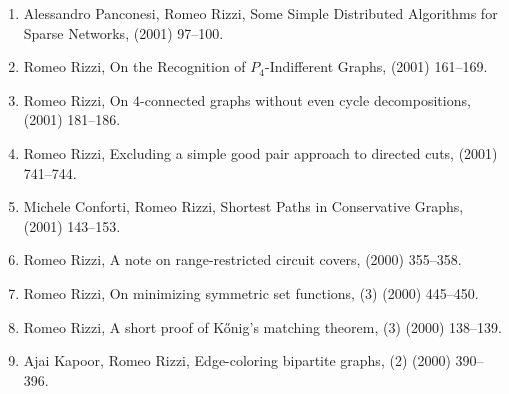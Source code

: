 \documentclass[11pt]{article}
\begin{document}
\begin{enumerate}
  \item {\sc Alessandro Panconesi, Romeo Rizzi},
   \newblock  Some Simple Distributed Algorithms for Sparse Networks,
    (2001) 97--100.

  \item {\sc Romeo Rizzi},
   \newblock  On the Recognition of $P_4$-Indifferent Graphs,
    (2001) 161--169.

  \item {\sc Romeo Rizzi},
   \newblock  On $4$-connected graphs without even cycle decompositions,
    (2001) 181--186.

  \item {\sc Romeo Rizzi},
   \newblock  Excluding a simple good pair approach to directed cuts,
    (2001) 741--744.

  \item {\sc Michele Conforti, Romeo Rizzi},  
   \newblock  Shortest Paths in Conservative Graphs,
    (2001) 143--153.

  \item {\sc Romeo Rizzi},
   \newblock  A note on range-restricted circuit covers,
    (2000) 355--358.

  \item {\sc Romeo Rizzi},
   \newblock  On minimizing symmetric set functions,
   (3) (2000) 445--450.

  \item {\sc Romeo Rizzi},
   \newblock  A short proof of K\H{o}nig's matching theorem,
   (3) (2000) 138--139.

  \item {\sc Ajai Kapoor, Romeo Rizzi},
   \newblock  Edge-coloring bipartite graphs,
   (2) (2000) 390--396.


\end{enumerate}
\end{document}
